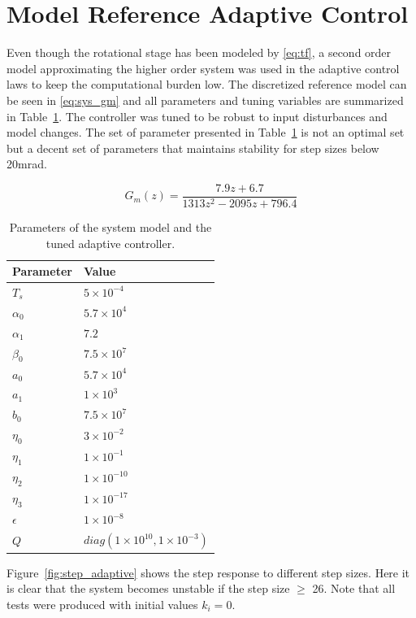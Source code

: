 \newpage
\FloatBarrier
\section{Model Reference Adaptive Control}
Even though the rotational stage has been modeled by \eqref{eq:tf}, a second order model approximating the higher order system was used in the adaptive control laws to keep the computational burden low. The discretized reference model can be seen in \eqref{eq:sys_gm} and all parameters and tuning variables are summarized in Table~\ref{tab:adaptive_param}. The controller was tuned to be robust to input disturbances and model changes. The set of parameter presented in Table~\ref{tab:adaptive_param} is not an optimal set but a decent set of parameters that maintains stability for step sizes below 20mrad.

\begin{equation}
  \label{eq:sys_gm}
  G_m(z) = \frac{7.9z + 6.7}{1313z^{2} - 2095z + 796.4}
\end{equation}

\begin{table}[h!]
  \centering
  \begin{tabular}{| l | l |}
    \hline
    Parameter & Value \\ \hline
    $T_s$ & $5 \times 10^{-4}$ \\
    $\alpha_0$ & $5.7 \times 10^{4}$ \\
    $\alpha_1$ & $7.2$ \\
    $\beta_0$ & $7.5 \times 10^{7}$ \\
    $a_0$ & $5.7 \times 10^{4}$ \\
    $a_1$ & $1 \times 10^{3}$ \\
    $b_0$ & $7.5 \times 10^{7}$ \\
    $\eta_0$ & $3 \times 10^{-2}$ \\
    $\eta_1$ & $1 \times 10^{-1}$ \\
    $\eta_2$ & $1 \times 10^{-10}$ \\
    $\eta_3$ & $1 \times 10^{-17}$ \\
    $\epsilon$ & $1 \times 10^{-8}$ \\
    $Q$ & $diag(1 \times 10^{10}, 1 \times 10^{-3})$\\
    \hline
  \end{tabular}
  \caption{\label{tab:adaptive_param} Parameters of the system model and the tuned adaptive controller.}
\end{table}

Figure~\ref{fig:step_adaptive} shows the step response to different step sizes. Here it is clear that the system becomes unstable if the step size $\geq$ \unit{26}{\milli\radian}. Note that all tests were produced with initial values $k_i = 0$.

